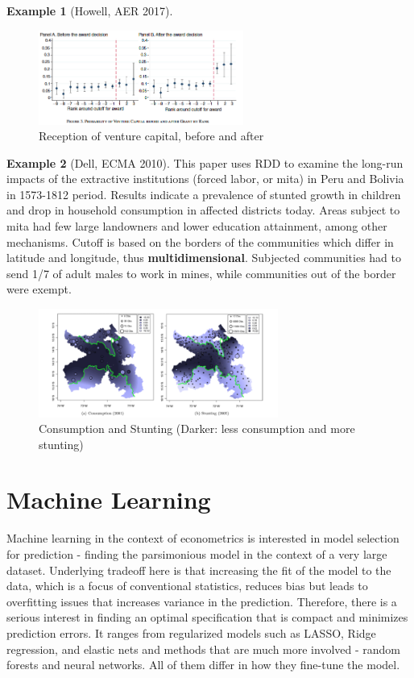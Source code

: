 \documentclass[12pt]{article}
\theoremstyle{definition}
\theoremstyle{property}
\theoremstyle{assumption}
\theoremstyle{example}
\newtheorem{example}{Example}[section]
\theoremstyle{comment}
\begin{document}
\begin{mdframed}[backgroundcolor=yellow!5]
\begin{example}[Howell, AER 2017]
\begin{figure}[H]
\centering
\includegraphics[width=0.6\textwidth, keepaspectratio]{RD_fig.png}
\caption{Reception of venture capital, before and after}
\end{figure}
\end{example}
\begin{example}[Dell, ECMA 2010] This paper uses RDD to examine the long-run impacts of the extractive institutions (forced labor, or mita) in Peru and Bolivia in 1573-1812 period. Results indicate a prevalence of stunted growth in children and drop in household consumption in affected districts today. Areas subject to mita had few large landowners and lower education attainment, among other mechanisms. Cutoff is based on the borders of the communities which differ in latitude and longitude, thus \textbf{multidimensional}. Subjected communities had to send 1/7 of adult males to work in mines, while communities out of the border were exempt.
\begin{figure}[H]
\centering
\includegraphics[width=0.7\textwidth, keepaspectratio]{RD_Dell.png}
\caption{Consumption and Stunting (Darker: less consumption and more stunting)}
\end{figure}
\end{example}
\end{mdframed}

\section{Machine Learning}
Machine learning in the context of econometrics is interested in model selection for prediction - finding the parsimonious model in the context of a very large dataset. Underlying tradeoff here is that increasing the fit of the model to the data, which is a focus of conventional statistics, reduces bias but leads to overfitting issues that increases variance in the prediction. Therefore, there is a serious interest in finding an optimal specification that is compact and minimizes prediction errors. It ranges from regularized models such as LASSO, Ridge regression, and elastic nets and methods that are much more involved - random forests and neural networks. All of them differ in how they fine-tune the model. \par
\end{document}
